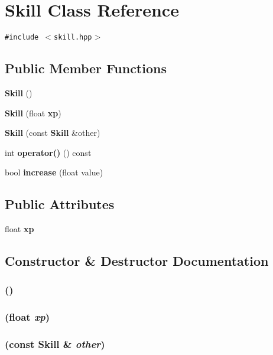\section{Skill Class Reference}
\label{classSkill}
{\tt \#include $<$skill.hpp$>$}

\subsection*{Public Member Functions}
\begin{CompactItemize}
\item 
{\bf Skill} ()
\item 
{\bf Skill} (float {\bf xp})
\item 
{\bf Skill} (const {\bf Skill} \&other)
\item 
int {\bf operator()} () const 
\item 
bool {\bf increase} (float value)
\end{CompactItemize}
\subsection*{Public Attributes}
\begin{CompactItemize}
\item 
float {\bf xp}
\end{CompactItemize}


\subsection{Constructor \& Destructor Documentation}
\subsubsection{ ()}\label{classSkill_a0}


\subsubsection{ (float {\em xp})}\label{classSkill_a1}


\subsubsection{ (const {\bf Skill} \& {\em other})}\label{classSkill_a2}




